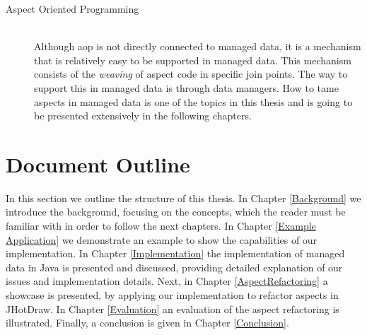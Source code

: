 \begin{description}
  \item[Aspect Oriented Programming]~\\
  Although \ac{aop} is not directly connected to managed data, it is a mechanism that is relatively easy to be supported in managed data.
  This mechanism consists of the \textit{weaving} of aspect code in specific join points. 
  The way to support this in managed data is through data managers. 
  How to tame aspects in managed data is one of the topics in this thesis and is going to be presented extensively in the following chapters.

\end{description}

\section{Document Outline}\label{Document Outline}
In this section we outline the structure of this thesis. 
In Chapter \ref{Background} we introduce the background, focusing on the concepts, which the reader must be familiar with in order to follow the next chapters.
In Chapter \ref{Example Application} we demonstrate an example to show the capabilities of our implementation.
In Chapter \ref{Implementation} the implementation of managed data in Java is presented and discussed, providing detailed explanation of our issues and implementation details.
Next, in Chapter \ref{AspectRefactoring} a showcase is presented, by applying our implementation to refactor aspects in JHotDraw.
In Chapter \ref{Evaluation} an evaluation of the aspect refactoring is illustrated.
Finally, a conclusion is given in Chapter \ref{Conclusion}. 

